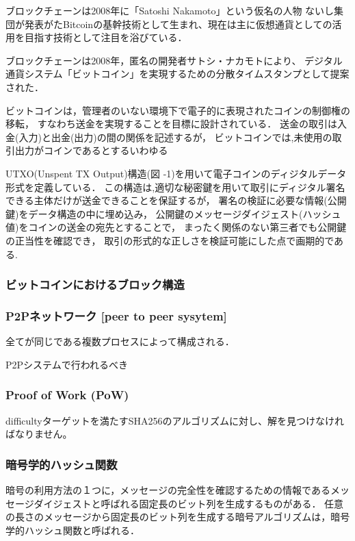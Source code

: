 \documentclass[a4paper,12pt]{jsarticle}
\begin{document}
ブロックチェーンは2008年に「Satoshi Nakamoto」という仮名の人物
ないし集団が発表がたBitcoinの基幹技術として生まれ、現在は主に仮想通貨としての活用を目指す技術として注目を浴びている．

ブロックチェーンは2008年，匿名の開発者サトシ・ナカモトにより、
デジタル通貨システム「ビットコイン」を実現するための分散タイムスタンプとして提案された．

ビットコインは，管理者のいない環境下で電子的に表現されたコインの制御権の移転，
すなわち送金を実現することを目標に設計されている．
送金の取引は入金(入力)と出金(出力)の間の関係を記述するが，
ビットコインでは,未使用の取引出力がコインであるとするいわゆる

UTXO(Unspent TX Output)構造(図 -1)を用いて電子コインのディジタルデータ形式を定義している．
この構造は,適切な秘密鍵を用いて取引にディジタル署名できる主体だけが送金できることを保証するが，
署名の検証に必要な情報(公開鍵)をデータ構造の中に埋め込み，
公開鍵のメッセージダイジェスト(ハッシュ値)をコインの送金の宛先とすることで，
まったく関係のない第三者でも公開鍵の正当性を確認でき，
取引の形式的な正しさを検証可能にした点で画期的である.

\subsubsection{ビットコインにおけるブロック構造}

\subsubsection{P2Pネットワーク [peer to peer sysytem]}
全てが同じである複数プロセスによって構成される．

P2Pシステムで行われるべき

\subsubsection{Proof of Work (PoW)}
difficultyターゲットを満たすSHA256のアルゴリズムに対し、解を見つけなければなりません。

\subsubsection{暗号学的ハッシュ関数} %
暗号の利用方法の１つに，メッセージの完全性を確認するための情報であるメッセージダイジェストと呼ばれる固定長のビット列を生成するものがある．
任意の長さのメッセージから固定長のビット列を生成する暗号アルゴリズムは，暗号学的ハッシュ関数と呼ばれる．
\end{document}

